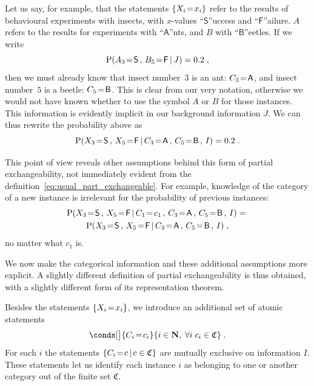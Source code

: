 \documentclass[\ifafour a4paper,12pt,\else a5paper,10pt,\fi%
onecolumn,oneside,article,%
british%
]{memoir}
\theoremstyle{remark}
\theoremstyle{innote}
\newcommand*{\NN}{\bm{\mathrm{N}}}
\DeclarePairedDelimiter\set{\{}{\}}
\newcommand*{\p}{\mathrm{P}}%
\renewcommand*{\|}[1][]{\nonscript\,#1\vert\nonscript\,\mathopen{}}
\renewcommand*{\=}{\TextOrMath\texteq\eq}
\newcommand*{\X}[1]{X_{#1}}
\newcommand*{\x}[1]{x_{#1}}
\newcommand*{\A}[1]{A_{#1}}
\newcommand*{\B}[1]{B_{#1}}
\newcommand*{\C}[1]{C_{#1}}
\newcommand*{\cc}[1]{c_{#1}}
\newcommand*{\sC}{\mathfrak{C}}
\newcommand*{\xs}{\textsf{S}}
\newcommand*{\xf}{\textsf{F}}
\newcommand*{\xA}{\textsf{A}}
\newcommand*{\xB}{\textsf{B}}
\newcommand*{\zI}{J}
\begin{document}
Let us say, for example, that the statements $\set{\X{i}\=\x{i}}$ refer to
the results of behavioural experiments with insects, with $x$-values
\enquote{$\xs$}uccess and \enquote{$\xf$}ailure. $A$ refers to the results
for experiments with \enquote{$\xA$}nts, and $B$ with
\enquote{$\xB$}eetles. If we write
$$\p(\A{3}\=\xs \,,\, \B{5}\=\xf \| \zI)=0.2\;,$$
then we must already know that insect number~$3$ is an ant: $\C{3}\=\xA$,
and insect number~$5$ is a beetle: $\C{5}\=\xB$. This is clear from our
very notation, otherwise we would not have known whether to use the symbol
$A$ or $B$ for those instances. This information is evidently implicit in
our background information $\zI$. We can thus rewrite the probability above
as
$$\p(\X{3}\=\xs \,,\, \X{5}\=\xf \| \C{3}\=\xA \,,\, \C{5}\=\xB \,,\, I)=0.2\;.$$


This point of view reveals other assumptions behind this form of partial
exchangeability, not immediately evident from the
definition~\eqref{eq:usual_part_exchangeable}. For example, knowledge of
the category of a new instance  is irrelevant for the probability of
previous instances:
\begin{multline*}
  \p(\X{3}\=\xs \,,\, \X{5}\=\xf \| \C{1}\=\cc{1} \,,\, \C{3}\=\xA \,,\,
  \C{5}\=\xB \,,\, I)= {}\\
  \p(\X{3}\=\xs \,,\, \X{5}\=\xf \| \C{3}\=\xA \,,\,
  \C{5}\=\xB \,,\, I)
  \;,
\end{multline*}
no matter what $\cc{1}$ is.


We now make the categorical information and these additional assumptions
more explicit. A slightly different definition of partial exchangeability
is thus obtained, with a slightly different form of its representation
theorem.

Besides the statements $\set{\X{i}\=\x{i}}$, we introduce an additional set
of atomic statements
\begin{equation}
  \label{eq:category_statements}
  \conds[\big]{\C{i}\=\cc{i}}{i \in \NN,\;
 \forall i\;\cc{i} \in \sC} \;.
\end{equation}
For each $i$ the statements $\set{\C{i}\=c \| c \in \sC}$ are mutually
exclusive on information $I$.
These statements let us identify each instance $i$ as belonging to one
or another category out of the finite set $\sC$.
\end{document}
